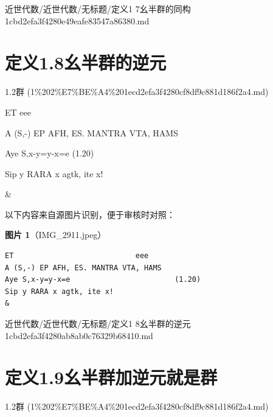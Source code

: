 \begin{note}[来源路径]

近世代数/近世代数/无标题/定义1 7幺半群的同构 1cbd2efa3f4280e49eafe83547a86380.md

\end{note}

\section*{定义1.8幺半群的逆元}

\begin{note}[来源上级主题]

1.2群 (1\%202\%E7\%BE\%A4\%201ecd2efa3f4280cf8df9c881d186f2a4.md)

\end{note}

\begin{definition}[定义1.8幺半群的逆元]

ET                            eee

A (S,-) EP AFH, ES. MANTRA VTA, HAMS

Aye S,x-y=y-x=e                        (1.20)

Sip y RARA x agtk, ite x!

\&

\end{definition}

\begin{note}
以下内容来自源图片识别，便于审核时对照：

\textbf{图片 1}（IMG\_2911.jpeg）
\begin{Verbatim}[fontsize=\small]
ET                            eee
A (S,-) EP AFH, ES. MANTRA VTA, HAMS
Aye S,x-y=y-x=e                        (1.20)
Sip y RARA x agtk, ite x!
&
\end{Verbatim}

\end{note}

\begin{note}[来源路径]

近世代数/近世代数/无标题/定义1 8幺半群的逆元 1cbd2efa3f4280ab8ab0c76329b68410.md

\end{note}

\section*{定义1.9幺半群加逆元就是群}

\begin{note}[来源上级主题]

1.2群 (1\%202\%E7\%BE\%A4\%201ecd2efa3f4280cf8df9c881d186f2a4.md)

\end{note}

